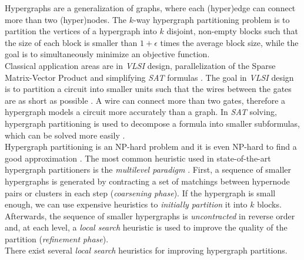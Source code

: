 Hypergraphs are a generalization of graphs, where each (hyper)edge can connect 
more than two (hyper)nodes. The $k$-way hypergraph partitioning problem is to 
partition the vertices of a hypergraph into $k$ disjoint, non-empty blocks such
that the size of each block is smaller than $1+\epsilon$ times the
average block size, while the goal is to simultaneously minimize an objective function. \\
Classical application areas are in \emph{VLSI} design, parallelization of
the Sparse Matrix-Vector Product and simplifying \emph{SAT} formulas 
\cite{karypis1999multilevel, mann2014formula, papa2007hypergraph}. The goal 
in \emph{VLSI} design is to partition a circuit into smaller units such that
the wires between the gates are as short as possible \cite{bulucc2016recent}.
A wire can connect more than two gates, therefore a hypergraph models a circuit more
accurately than a graph. In \emph{SAT} solving, hypergraph partitioning is used to
decompose a formula into smaller subformulas, which can be solved more easily \cite{mann2014formula}.\\
Hypergraph partitioning is an NP-hard problem \cite{lengauer2012combinatorial} and
it is even NP-hard to find a good approximation \cite{bui1992finding}.
The most common heuristic used in state-of-the-art hypergraph partitioners is the
\emph{multilevel paradigm} \cite{catalyurek1999hypergraph, heuer2017improving, karypis1999multilevel}.
First, a sequence of smaller hypergraphs is generated by contracting a set of matchings between hypernode pairs
or clusters in each step (\emph{coarsening phase}). If the hypergraph is small enough, we can use expensive
heuristics to \emph{initially partition} it into $k$ blocks. Afterwards, the sequence
of smaller hypergraphs is \emph{uncontracted} in reverse order and, at each level, a 
\emph{local search} heuristic is used to improve the quality of the partition 
(\emph{refinement phase}). \\
There exist several \emph{local search} heuristics for improving hypergraph partitions.
